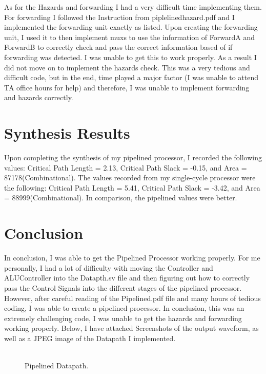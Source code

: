 \documentclass{article}
\begin{document}
As for the Hazards and forwarding I had a very difficult time implementing them. For forwarding I followed the Instruction from piplelinedhazard.pdf and I implemented the forwarding unit exactly as listed. Upon creating the forwarding unit, I used it to then implement muxs to use the information of ForwardA and ForwardB to correctly check and pass the correct information based of if forwarding was detected. I was unable to get this to work properly. As a result I did not move on to implement the hazards check. This was a very tedious and difficult code, but in the end, time played a major factor (I was unable to attend TA office hours for help) and therefore, I was unable to implement forwarding and hazards correctly.

\section{Synthesis Results}
Upon completing the synthesis of my pipelined processor, I recorded the following values: Critical Path Length = 2.13, Critical Path Slack = -0.15, and Area = 87178(Combinational). The values recorded from my single-cycle processor were the following: Critical Path Length = 5.41, Critical Path Slack = -3.42, and Area = 88999(Combinational). In comparison, the pipelined values were better.

\section{Conclusion}
In conclusion, I was able to get the Pipelined Processor working properly. For me personally, I had a lot of difficulty with moving the Controller and ALUController into the Datapth.sv file and then figuring out how to correctly pass the Control Signals into the different stages of the pipelined processor. However, after careful reading of the Pipelined.pdf file and many hours of tedious coding, I was able to create a pipelined processor. In conclusion, this was an extremely challenging code, I was unable to get the hazards and forwarding working properly. Below, I have attached Screenshots of the output waveform, as well as a JPEG image of the Datapath I implemented.\\\\

\begin{figure}
  \caption{Pipelined Datapath.}
  \label{Figure 1}
\end{figure} 
\end{document}
